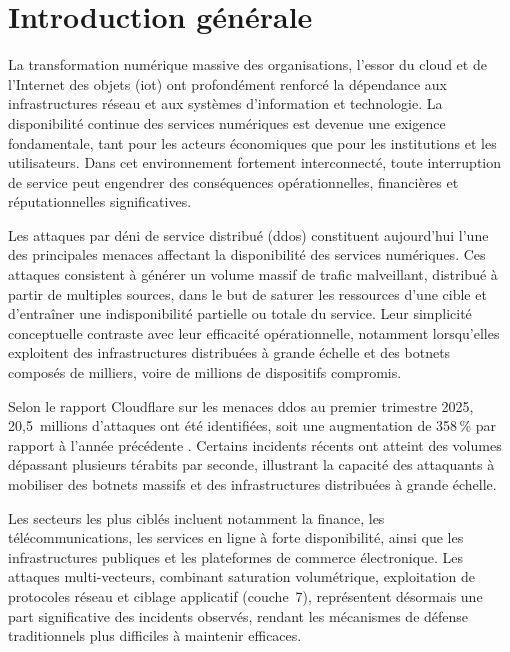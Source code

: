 \chapter*{Introduction générale}


La transformation numérique massive des organisations, l'essor du cloud et de l'Internet des objets (\gls{iot}) ont profondément renforcé la dépendance aux infrastructures réseau et aux systèmes d'information et technologie. La disponibilité continue des services numériques est devenue une exigence fondamentale, tant pour les acteurs économiques que pour les institutions et les utilisateurs. Dans cet environnement fortement interconnecté, toute interruption de service peut engendrer des conséquences opérationnelles, financières et réputationnelles significatives.

Les attaques par déni de service distribué (\gls{ddos}) constituent aujourd'hui l'une des principales menaces affectant la disponibilité des services numériques. Ces attaques consistent à générer un volume massif de trafic malveillant, distribué à partir de multiples sources, dans le but de saturer les ressources d'une cible et d'entraîner une indisponibilité partielle ou totale du service. Leur simplicité conceptuelle contraste avec leur efficacité opérationnelle, notamment lorsqu'elles exploitent des infrastructures distribuées à grande échelle et des botnets composés de milliers, voire de millions de dispositifs compromis.

Selon le rapport Cloudflare sur les menaces \gls{ddos} au premier trimestre 2025, 20,5~millions d'attaques ont été identifiées, soit une augmentation de 358\,\% par rapport à l'année précédente \parencite{cloudflare2025}. Certains incidents récents ont atteint des volumes dépassant plusieurs térabits par seconde, illustrant la capacité des attaquants à mobiliser des botnets massifs et des infrastructures distribuées à grande échelle.

Les secteurs les plus ciblés incluent notamment la finance, les télécommunications, les services en ligne à forte disponibilité, ainsi que les infrastructures publiques et les plateformes de commerce électronique. Les attaques multi-vecteurs, combinant saturation volumétrique, exploitation de protocoles réseau et ciblage applicatif (couche~7), représentent désormais une part significative des incidents observés, rendant les mécanismes de défense traditionnels plus difficiles à maintenir efficaces.

